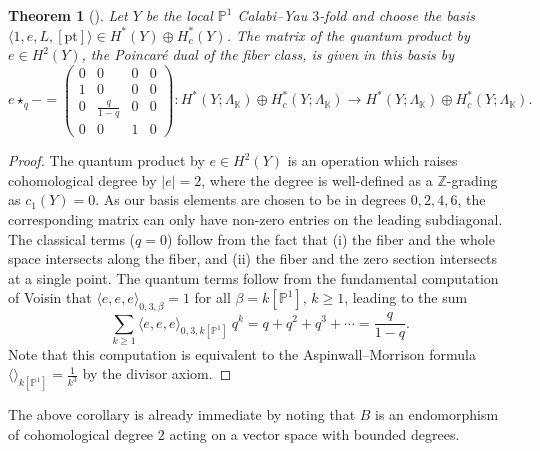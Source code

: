 \documentclass[reqno]{amsart}
\numberwithin{equation}{section}
\numberwithin{equation}{section}
\numberwithin{equation}{section}
\newtheorem{thm}{Theorem}[section]
\newtheorem{cor}[thm]{Corollary}
\theoremstyle{definition}
\theoremstyle{remark}
\theoremstyle{remark}
\begin{document}
\begin{thm}[\cite{Voi96}]\label{thm:localP1-qconn}
    Let $Y$ be the local $\mathbb{P}^1$ Calabi--Yau $3$-fold and choose the basis $\langle 1, e, L, [\mathrm{pt}] \rangle \in H^*(Y) \oplus H^*_c(Y)$. The matrix of the quantum product by $e \in H^2(Y)$, the Poincar\'e dual of the fiber class, is given in this basis by
    \begin{equation}
        e  \star_q - = \begin{pmatrix} 0 & 0 & 0 & 0 \\ 1 & 0 & 0 & 0 \\ 0 & \frac{q}{1-q} & 0 & 0 \\ 0 & 0& 1& 0 \end{pmatrix} : H^*(Y; \Lambda_{\mathbb{K}}) \oplus H^*_c(Y; \Lambda_{\mathbb{K}}) \to H^*(Y; \Lambda_{\mathbb{K}}) \oplus H^*_c(Y; \Lambda_{\mathbb{K}}).
    \end{equation}
\end{thm}
\begin{proof}
    The quantum product by $e \in H^2(Y)$ is an operation which raises cohomological degree by $|e|=2$, where the degree is well-defined as a $\mathbb{Z}$-grading as $c_1(Y) = 0$. As our basis elements are chosen to be in degrees $0, 2, 4, 6$, the corresponding matrix can only have non-zero entries on the leading subdiagonal. The classical terms ($q=0$) follow from the fact that (i) the fiber and the whole space intersects along the fiber, and (ii) the fiber and the zero section intersects at a single point. The quantum terms follow from the fundamental computation of Voisin \cite[Theorem 1.1]{Voi96} that $\langle e, e, e\rangle_{0, 3, \beta} = 1$ for all $\beta = k [\mathbb{P}^1]$, $k \ge 1$, leading to the sum 
    \begin{equation}
    \sum_{k \ge 1} \langle e, e, e \rangle_{0, 3, k[\mathbb{P}^1]} \   q^k = q + q^2 +  q^3 + \cdots = \frac{q}{1-q}.
    \end{equation}
    Note that this computation is equivalent to the Aspinwall--Morrison formula $\langle  \rangle_{k [\mathbb{P}^1]} = \frac{1}{k^3}$ by the divisor axiom. 
\end{proof}

The above corollary is already immediate by noting that $B$ is an endomorphism of cohomological degree $2$ acting on a vector space with bounded degrees.
\end{document}
